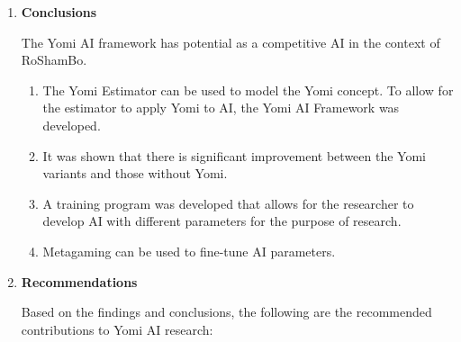 \begin{enumerate}[leftmargin=0em, itemindent=1.8em]
{\begin{enumerate}[label*=\arabic*., leftmargin=0em,  listparindent=3em]
\begin{enumerate}[label=\arabic*.]
\item The use of Genetic Algorithm in the context of metagaming allows for the parameters to be fine-tuned.

\end{enumerate}

\hspace{1em}

\item \begin{center}\textbf{Conclusions}\end{center}

\ifnotUCFormat
\else
	\hspace{1em}
\fi

The Yomi AI framework has potential as a competitive AI in the context of RoShamBo. 

\begin{enumerate}[label=\arabic*.]
\item The Yomi Estimator can be used to model the Yomi concept. To allow for the estimator to apply Yomi to AI, the Yomi AI Framework was developed.

\item It was shown that there is significant improvement between the Yomi variants and those without Yomi.

\item A training program was developed that allows for the researcher to develop AI with different parameters for the purpose of research.

\item Metagaming can be used to fine-tune AI parameters.
\end{enumerate}

\hspace{1em}

\item \begin{center}\textbf{Recommendations}\end{center}

\ifnotUCFormat
\else
	\hspace{1em}
\fi

Based on the findings and conclusions, the following are the recommended contributions to Yomi AI research:


\end{enumerate}}
\end{enumerate}
